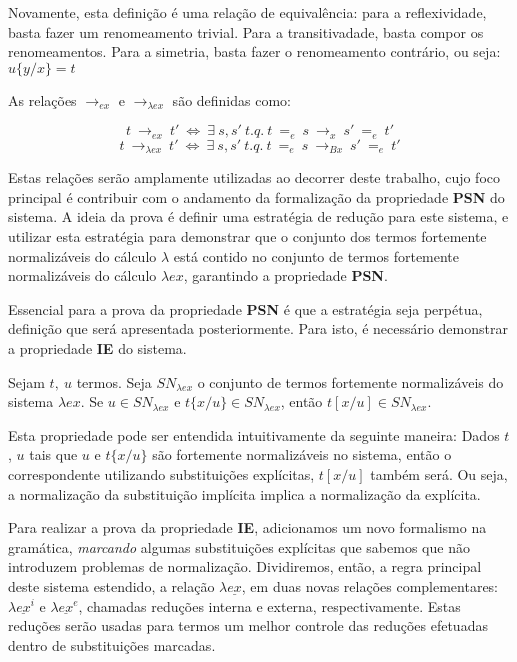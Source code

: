 Novamente, esta definição é uma relação de equivalência: para a reflexividade,
basta fazer um renomeamento trivial. Para a transitivadade, basta compor os
renomeamentos.  Para a simetria, basta fazer o renomeamento contrário, ou seja:
$ u\{y/x\} = t $


As relações $\rightarrow_{ex}$ e $\rightarrow_{\lambda
    ex}$ são definidas como:

\[t\ \rightarrow_{ex}\ t'\ \iff\ \exists\ s,s'\ t.q.\ t\ =_{e}\ s\
    \rightarrow_x\ s'\ =_e\ t' \]
\[t\ \rightarrow_{\lambda ex}\ t'\ \iff\ \exists\ s,s'\ t.q.\ t\ =_{e}\ s\
    \rightarrow_{Bx}\ s'\ =_e\ t' \]

Estas relações serão amplamente utilizadas ao decorrer deste trabalho, cujo foco
principal é contribuir com o andamento da formalização da propriedade
\textbf{PSN} do sistema.  A ideia da prova é definir uma estratégia de redução
para este sistema, e utilizar esta estratégia para demonstrar que o conjunto dos
termos fortemente normalizáveis do cálculo $\lambda$ está contido no conjunto de
termos fortemente normalizáveis do cálculo $\lambda ex$, garantindo a
propriedade \textbf{PSN}.

Essencial para a prova da propriedade \textbf{PSN} é que a estratégia seja
perpétua, definição que será apresentada posteriormente. Para isto, é necessário
demonstrar a propriedade \textbf{IE} do sistema.

\begin{definicao}[Propriedade IE]
    Sejam $t,\ u$ termos. Seja $SN_{\lambda ex}$ o conjunto de termos fortemente
    normalizáveis do sistema $\lambda ex$. Se $u \in SN_{\lambda ex}$ e
    $t\{x/u\} \in SN_{\lambda ex}$, então $t[x/u] \in SN_{\lambda ex}$.
\end{definicao}

Esta propriedade pode ser entendida intuitivamente da seguinte maneira: Dados
$t$, $u$ tais que $u$ e $t\{x/u\}$ são fortemente normalizáveis no sistema,
então o correspondente utilizando substituições explícitas, $t[x/u]$ também
será. Ou seja, a normalização da substituição implícita implica a normalização
da explícita.

Para realizar a prova da propriedade \textbf{IE}, adicionamos um novo formalismo
na gramática, \emph{marcando} algumas substituições explícitas que sabemos que
não introduzem problemas de normalização. Dividiremos, então, a regra principal
deste sistema estendido, a relação $\lambda \underline{ex}$, em duas novas
relações complementares: $\lambda \underline{ex}^i$ e $\lambda
\underline{ex}^e$, chamadas reduções interna e externa, respectivamente. Estas
reduções serão usadas para termos um melhor controle das reduções efetuadas dentro
de substituições marcadas.

